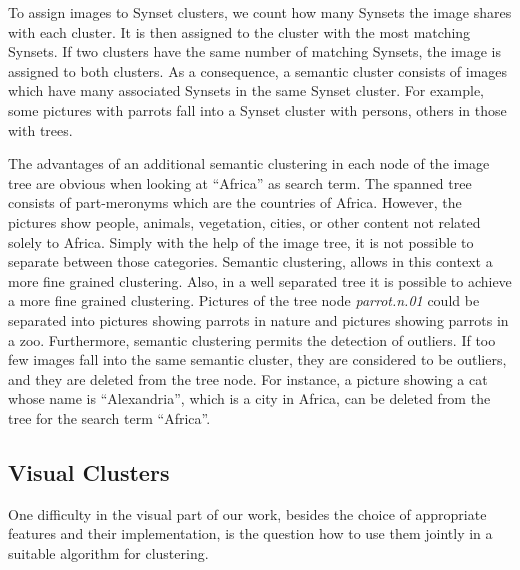 \bigskip
To assign images to Synset clusters, we count how many Synsets the image shares with each cluster. It is then assigned to the cluster with the most matching Synsets. If two clusters have the same number of matching Synsets, the image is assigned to both clusters. As a consequence, a semantic cluster consists of images which have many associated Synsets in the same Synset cluster. For example, some pictures with parrots fall into a Synset cluster with persons, others in those with trees.

\bigskip
The advantages of an additional semantic clustering in each node of the image tree are obvious when looking at ``Africa'' as search term. The spanned tree consists of part-meronyms which are the countries of Africa. However, the pictures show people, animals, vegetation, cities, or other content not related solely to Africa. Simply with the help of the image tree, it is not possible to separate between those categories. Semantic clustering, allows in this context a more fine grained clustering. Also, in a well separated tree it is possible to achieve a more fine grained clustering. Pictures of the tree node \emph{parrot.n.01} could be separated into pictures showing parrots in nature and pictures showing parrots in a zoo. Furthermore, semantic clustering permits the detection of outliers. If too few images fall into the same semantic cluster, they are considered to be outliers, and they are deleted from the tree node. For instance, a picture showing a cat whose name is ``Alexandria'', which is a city in Africa, can be deleted from the tree for the search term ``Africa''.

\subsection{Visual Clusters}
\label{sec_visualclustering}

One difficulty in the visual part of our work, besides the choice of appropriate features and their implementation, is the question how to use them jointly in a suitable algorithm for clustering.

